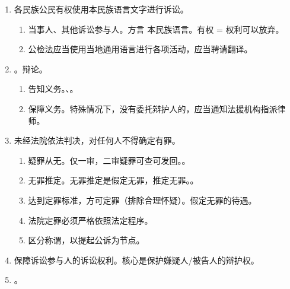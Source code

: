 \begin{enumerate}
\begin{enumerate}
\begin{enumerate}
\begin{enumerate}
                          \item 再审抗诉。上级检，针对下级法院已生效判决，向同级法院提出再审抗诉。
                        \end{enumerate}
                  \item 死刑复核。最高检可以提出意见，最高法应当结果通报。
                  \item 特别程序。决定 \yjt 纠正意见。裁定、判决 \yjt 抗诉。
                \end{enumerate}
          \item 执行监督。死刑 \yjt 临场。监外执行、减刑/假释 \yjt 事前/事后。
        \end{enumerate}
  \item 各民族公民有权使用本民族语言文字进行诉讼。
        \begin{enumerate}
          \item 当事人、其他诉讼参与人。方言 \bdy 本民族语言。有权 = 权利可以放弃。
          \item 公检法应当使用当地通用语言进行各项活动，应当聘请翻译。
        \end{enumerate}
  \item {}。\bdy 辩论。
        \begin{enumerate}
          \item 告知义务。、。
          \item 保障义务。特殊情况下，没有委托辩护人的，应当通知法援机构指派律师。
        \end{enumerate}
  \item \san 未经法院依法判决，对任何人不得确定有罪。
        \begin{enumerate}
          \item \bdy 疑罪从无。仅一审，二审疑罪可查可发回。。
          \item \bdy 无罪推定。无罪推定是假定无罪，推定无罪。。
          \item 达到定罪标准，方可定罪（排除合理怀疑）。假定无罪的待遇。
          \item 法院定罪必须严格依照法定程序。
          \item 区分称谓，以提起公诉为节点。
        \end{enumerate}
  \item 保障诉讼参与人的诉讼权利。核心是保护嫌疑人/被告人的辩护权。
  \item \yi {}。

\end{enumerate}
